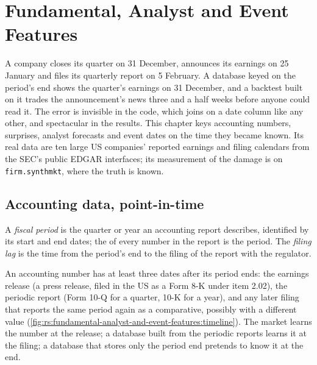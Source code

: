 \chapter{Fundamental, Analyst and Event Features}\label{ch:rs:fundamental-analyst-and-event-features}

A company closes its quarter on 31 December, announces its earnings on 25 January and files its quarterly report on 5
February. A database keyed on the period's end shows the quarter's earnings on 31 December, and a backtest built on it trades
the announcement's news three and a half weeks before anyone could read it. The error is invisible in the code, which joins
on a date column like any other, and spectacular in the results. This chapter keys accounting numbers, surprises, analyst
forecasts and event dates on the time they became known. Its real data are ten large US companies' reported earnings and
filing calendars from the SEC's public EDGAR interfaces; its measurement of the damage is on \texttt{firm.synthmkt}, where the
truth is known.

\section{Accounting data, point-in-time}

\begin{definition}\label{def:rs:fundamental-analyst-and-event-features:fiscal}
A \emph{fiscal period} is the quarter or year an accounting report describes, identified by its start and
end dates; the  of every number in the report is the period. The \emph{filing lag} is the time from
the period's end to the filing of the report with the regulator.
\end{definition}

An accounting number has at least three dates after its period ends: the earnings release (a press release, filed in the US as a
Form 8-K under item 2.02), the periodic report (Form 10-Q for a quarter, 10-K for a year), and any later filing that reports the
same period again as a comparative, possibly with a different value
(\cref{fig:rs:fundamental-analyst-and-event-features:timeline}). The market learns the number at the release; a database built
from the periodic reports learns it at the filing; a database that stores only the period end pretends to know it at the end.

